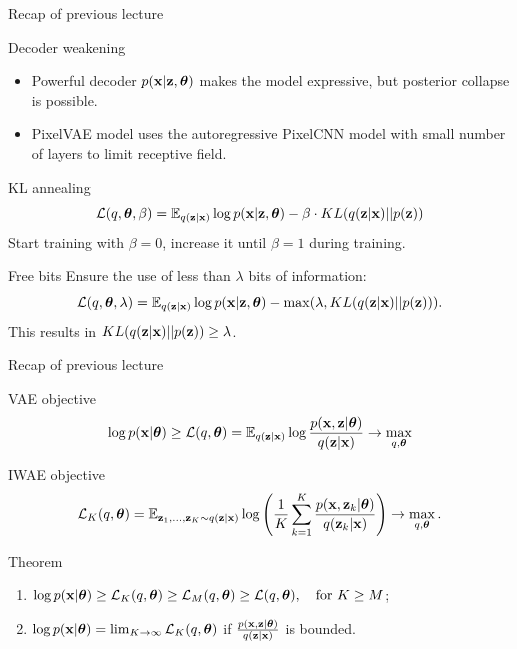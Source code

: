 \begin{frame}{Recap of previous lecture}
	\begin{block}{Decoder weakening}
		\begin{itemize}
			\item Powerful decoder $p(\mathbf{x} | \mathbf{z}, \boldsymbol{\theta})$ makes the model expressive, but posterior collapse is possible.
			\item PixelVAE model uses the autoregressive PixelCNN model with small number of layers to limit receptive field.
		\end{itemize}
	\end{block}
	
	\begin{block}{KL annealing}
		\vspace{-0.2cm}
		\[
		    \mathcal{L}(q, \boldsymbol{\theta}, \beta) = \mathbb{E}_{q(\mathbf{z} | \mathbf{x})} \log p(\mathbf{x} | \mathbf{z}, \boldsymbol{\theta}) - \beta \cdot KL (q(\mathbf{z} | \mathbf{x}) || p(\mathbf{z}))
		\]
		Start training with $\beta = 0$, increase it until $\beta = 1$ during training.
	\end{block}
	
	\begin{block}{Free bits}
		Ensure the use of less than $\lambda$ bits of information:
		\[
		    \mathcal{L}(q, \boldsymbol{\theta}, \lambda) = \mathbb{E}_{q(\mathbf{z} | \mathbf{x})} \log p(\mathbf{x} | \mathbf{z}, \boldsymbol{\theta}) - \max(\lambda, KL (q(\mathbf{z} | \mathbf{x}) || p(\mathbf{z}))).
		\]
		This results in $KL (q(\mathbf{z} | \mathbf{x}) || p(\mathbf{z})) \geq \lambda$.
	\end{block}
\end{frame}
\begin{frame}{Recap of previous lecture}
	\begin{block}{VAE objective}
		\vspace{-0.2cm}
		\[
		\log p(\mathbf{x} | \boldsymbol{\theta}) \geq \mathcal{L} (q, \boldsymbol{\theta})  = \mathbb{E}_{q(\mathbf{z} | \mathbf{x})} \log \frac{p(\mathbf{x}, \mathbf{z} | \boldsymbol{\theta})}{q(\mathbf{z}| \mathbf{x})} \rightarrow \max_{q, \boldsymbol{\theta}}
		\]
		\vspace{-0.2cm}
	\end{block}
	\begin{block}{IWAE objective}
		\vspace{-0.4cm}
		\[
		\mathcal{L}_K (q, \boldsymbol{\theta})  = \mathbb{E}_{\mathbf{z}_1, \dots, \mathbf{z}_K \sim q(\mathbf{z} | \mathbf{x})} \log \left( \frac{1}{K}\sum_{k=1}^K\frac{p(\mathbf{x}, \mathbf{z}_k | \boldsymbol{\theta})}{q(\mathbf{z}_k| \mathbf{x})} \right) \rightarrow \max_{q, \boldsymbol{\theta}}.
		\]
		\vspace{-0.4cm}
	\end{block}
	\begin{block}{Theorem}
		\begin{enumerate}
			\item $\log p(\mathbf{x} | \boldsymbol{\theta}) \geq \mathcal{L}_K (q, \boldsymbol{\theta}) \geq \mathcal{L}_M (q, \boldsymbol{\theta}) \geq \mathcal{L} (q, \boldsymbol{\theta}), \quad \text{for } K \geq M$;
			\item $\log p(\mathbf{x} | \boldsymbol{\theta}) = \lim_{K \rightarrow \infty} \mathcal{L}_K (q, \boldsymbol{\theta})$ if $\frac{p(\mathbf{x}, \mathbf{z} | \boldsymbol{\theta})}{q(\mathbf{z} | \mathbf{x})}$ is bounded.
		\end{enumerate}
	\end{block}
	
\end{frame}

